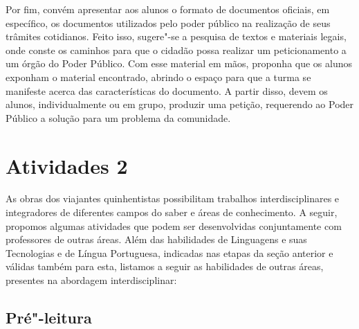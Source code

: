 \documentclass[12pt]{extarticle}
\begin{document}
Por fim, convém apresentar aos alunos o formato de
documentos oficiais, em específico, os documentos utilizados pelo poder
público na realização de seus trâmites cotidianos. Feito isso, sugere"-se
a pesquisa de textos e materiais legais, onde conste os caminhos para
que o cidadão possa realizar um peticionamento a um órgão do Poder
Público. Com esse material em mãos, proponha que os alunos exponham o
material encontrado, abrindo o espaço para que a turma se manifeste
acerca das características do documento. A partir disso, devem os
alunos, individualmente ou em grupo, produzir uma petição, requerendo ao
Poder Público a solução para um problema da comunidade.

\section{Atividades 2}

As obras dos viajantes quinhentistas possibilitam trabalhos
interdisciplinares e integradores de diferentes campos do saber e áreas
de conhecimento. A seguir, propomos algumas atividades que podem ser
desenvolvidas conjuntamente com professores de outras áreas. Além das
habilidades de Linguagens e suas Tecnologias e de Língua Portuguesa,
indicadas nas etapas da seção anterior e válidas também para esta,
listamos a seguir as habilidades de outras áreas, presentes na abordagem
interdisciplinar:


\subsection{Pré"-leitura}

\end{document}
